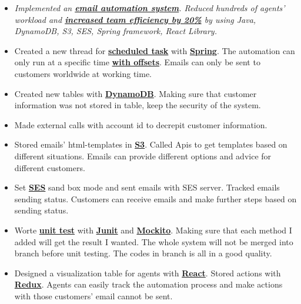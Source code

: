 \documentclass{article}
\begin{document}
\begin{itemize}
 \item[] \textit{Implemented an \textbf{\underline{email automation system}}. Reduced hundreds of agents' workload and \textbf{\underline{increased team efficiency by 20\%}} by using Java, DynamoDB, S3, SES, Spring framework, React Library. }
 
 \item Created a new thread for \textbf{\underline{scheduled task}} with \textbf{\underline{Spring}}. The automation can only run at a specific time \textbf{\underline{with offsets}}. Emails can only be sent to customers worldwide at working time.
 
 \item Created new tables with \textbf{\underline{DynamoDB}}. Making sure that customer information was not stored in table, keep the security of the system.
 
 \item Made external calls with account id to decrepit customer information.
 
 \item Stored emails' html-templates in \textbf{\underline{S3}}. Called Apis to get templates based on different situations. Emails can provide different options and advice for different customers.
 
 \item Set \textbf{\underline{SES}} sand box mode and sent emails with SES server. Tracked emails sending status. Customers can receive emails and make further steps based on sending status.
 
 \item Worte \textbf{\underline{unit test}} with \textbf{\underline{Junit}} and \textbf{\underline{Mockito}}. Making sure that each method I added will get the result I wanted. The whole system will not be merged into branch before unit testing. The codes in branch is all in a good quality.
 
 \item Designed a visualization table for agents with \textbf{\underline{React}}. Stored actions with \textbf{\underline{Redux}}. Agents can easily track the automation process and make actions with those customers' email cannot be sent.
\end{itemize}
\end{document}
